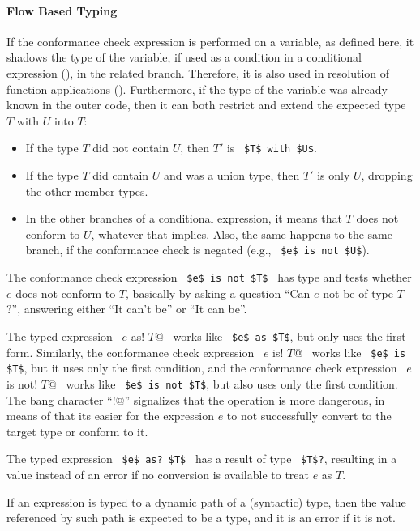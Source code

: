 \paragraph{Flow Based Typing} 
If the conformance check expression is performed on a variable, as defined here, it shadows the type of the variable, if used as a condition in a conditional expression (), in the related branch. Therefore, it is also used in resolution of function applications (). Furthermore, if the type of the variable was already known in the outer code, then it can both restrict and extend the expected type $T$ with $U$ into $T$: 
\begin{itemize}
  \item If the type $T$ did not contain $U$, then $T'$ is ~\lstinline!$T$ with $U$!.
  \item If the type $T$ did contain $U$ and was a union type, then $T'$ is only $U$, dropping the other member types. 
  \item In the other branches of a conditional expression, it means that $T$ does not conform to $U$, whatever that implies. Also, the same happens to the same branch, if the conformance check is negated (e.g., ~\lstinline!$e$ is not $U$!). 
\end{itemize}

The conformance check expression ~\lstinline!$e$ is not $T$!~ has type  and tests whether $e$ does not conform to $T$, basically by asking a question ``Can $e$ not be of type $T$?'', answering either ``It can't be'' or ``It can be''.

The typed expression ~\lstinline@$e$ as! $T$@~ works like ~\lstinline!$e$ as $T$!, but only uses the first form. Similarly, the conformance check expression ~\lstinline@$e$ is! $T$@~ works like ~\lstinline!$e$ is $T$!, but it uses only the first condition, and the conformance check expression ~\lstinline@$e$ is not! $T$@~ works like ~\lstinline!$e$ is not $T$!, but also uses only the first condition. The bang character ``\lstinline@!@'' signalizes that the operation is more dangerous, in means of that its easier for the expression $e$ to not successfully convert to the target type or conform to it. 

The typed expression ~\lstinline!$e$ as? $T$!~ has a result of type ~\lstinline!$T$?!, resulting in a  value instead of an error if no conversion is available to treat $e$ as $T$. 

If an expression is typed to a dynamic path of a (syntactic) type, then the value referenced by such path is expected to be a type, and it is an error if it is not. 

